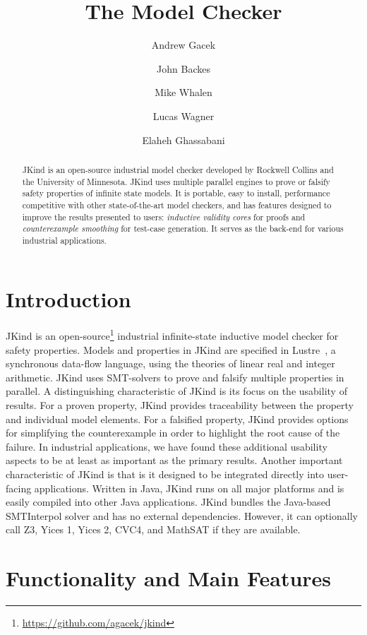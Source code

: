 \documentclass{llncs}
\title{The \jkind Model Checker}
\author{
  Andrew Gacek\inst{1} \and
  John Backes\inst{1} \and
  Mike Whalen\inst{2} \and
  Lucas Wagner\inst{1} \and
  Elaheh Ghassabani\inst{2}
}
\institute{
  Rockwell Collins \\
  \email{andrew.gacek@gmail.com}, \email{john.backes@gmail.com}, \email{lucas.wagner@rockwellcollins.com}
  \and
  University of Minnesota \\
  \email{ghass013@umn.edu}, \email{mwwhalen@umn.edu}
}
\newcommand{\jkind}{{\sc JKind}\xspace}
\newcommand{\lustre}{{\sc Lustre}\xspace}
\newcommand{\yices}{{\sc Yices}\xspace}
\newcommand{\zthree}{{\sc Z3}\xspace}
\begin{document}
\maketitle

\begin{abstract}
\jkind is an open-source industrial model checker developed by
Rockwell Collins and the University of Minnesota.  \jkind uses
multiple parallel engines to prove or falsify safety properties of
infinite state models. It is portable, easy to install, performance
competitive with other state-of-the-art model checkers, and has
features designed to improve the results presented to users: {\em
  inductive validity cores} for proofs and {\em counterexample
  smoothing} for test-case generation.  It serves as the back-end for
various industrial applications.
\end{abstract}

\section{Introduction}

\jkind is an
open-source\footnote{\url{https://github.com/agacek/jkind}} industrial
infinite-state inductive model checker for safety properties. Models
and properties in \jkind are specified in
\lustre~\cite{halbwachs1991ieee}, a synchronous data-flow language,
using the theories of linear real and integer arithmetic. \jkind uses
SMT-solvers to prove and falsify multiple properties in parallel.
%
A distinguishing characteristic of \jkind is its focus on the usability  of results. For a proven property, \jkind provides traceability between the property and individual model elements. For a falsified property, \jkind provides options for simplifying the
counterexample in order to highlight the root cause of the failure. In industrial applications, we have found these additional usability aspects to be at least as important as the primary results.
%
Another important characteristic of \jkind is that is it designed to be integrated directly into user-facing applications. Written in Java, \jkind runs on all major platforms and is easily compiled into other Java applications. \jkind bundles the Java-based {\sc SMTInterpol} solver and has no external dependencies. However, it can optionally call \zthree, \yices 1, \yices 2, {\sc CVC4}, and {\sc
  MathSAT} if they are available.

\section{Functionality and Main Features}
\end{document}
